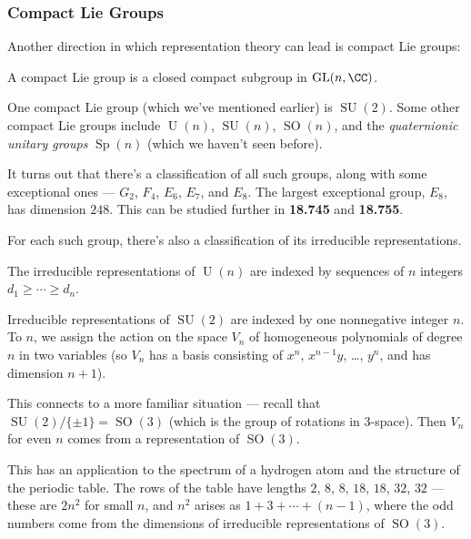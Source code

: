 \subsubsection{Compact Lie Groups}

Another direction in which representation theory can lead is compact Lie groups: 

\begin{definition}
A compact Lie group is a closed compact subgroup in $\operatorname{GL}(n, \CC)$. 
\end{definition}

\begin{example}
One compact Lie group (which we've mentioned earlier) is $\operatorname{SU}(2)$. Some other compact Lie groups include $\operatorname{U}(n)$, $\operatorname{SU}(n)$, $\operatorname{SO}(n)$, and the \emph{quaternionic unitary groups} $\operatorname{Sp}(n)$ (which we haven't seen before). 
\end{example}

It turns out that there's a classification of all such groups, along with some exceptional ones --- $G_2$, $F_4$, $E_6$, $E_7$, and $E_8$. The largest exceptional group, $E_8$, has dimension $248$. This can be studied further in \textbf{18.745} and \textbf{18.755}. 

For each such group, there's also a classification of its irreducible representations. 

\begin{fact}
The irreducible representations of $\operatorname{U}(n)$ are indexed by sequences of $n$ integers $d_1 \geq \cdots \geq d_n$. 
\end{fact}

\begin{example}
Irreducible representations of $\operatorname{SU}(2)$ are indexed by one nonnegative integer $n$. To $n$, we assign the action on the space $V_n$ of homogeneous polynomials of degree $n$ in two variables (so $V_n$ has a basis consisting of $x^n$, $x^{n - 1}y$, \ldots, $y^n$, and has dimension $n + 1$). 
\end{example}

This connects to a more familiar situation --- recall that $\operatorname{SU}(2)/\{\pm 1\} = \operatorname{SO}(3)$ (which is the group of rotations in $3$-space). Then $V_n$ for even $n$ comes from a representation of $\operatorname{SO}(3)$. 

This has an application to the spectrum of a hydrogen atom and the structure of the periodic table. The rows of the table have lengths $2$, $8$, $8$, $18$, $18$, $32$, $32$ --- these are $2n^2$ for small $n$, and $n^2$ arises as $1 + 3 + \cdots + (n - 1)$, where the odd numbers come from the dimensions of irreducible representations of $\operatorname{SO}(3)$. 

